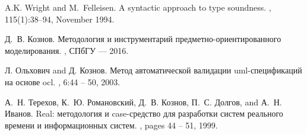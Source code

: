 \begin{thebibliography}{10}
A.K. Wright and M.~Felleisen.
\newblock A syntactic approach to type soundness.
, 115(1):38--94, November 1994.

Д.~В. Кознов.
\newblock Методология и инструментарий
  предметно-ориентированного
  моделирования.
, СПбГУ
  --- 2016.

Л. Ольхович and Д. Кознов.
\newblock Метод автоматической валидации
  uml-спецификаций на основе ocl.
, 6:44 -- 50, 2003.

А.~Н. Терехов, К.~Ю. Романовский, Д.~В. Кознов,
  П.~С. Долгов, and А.~Н. Иванов.
\newblock Real: методология и case-средство для
  разработки систем реального времени и
  информационных систем.
, pages 44 -- 51, 1999.

\end{thebibliography}

  
